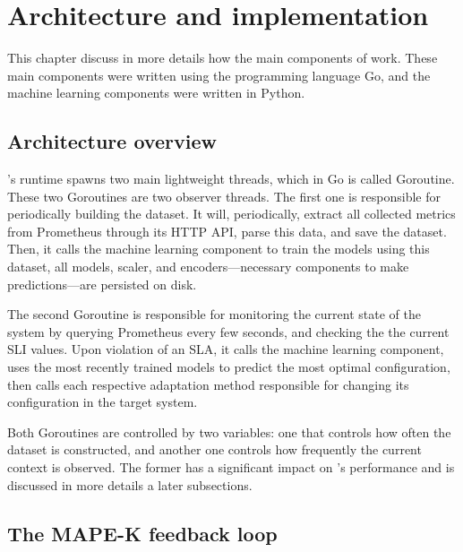 \section{Architecture and implementation}

This chapter discuss in more details how the main components of \projectname{} work. These main components were written using the programming language Go, and the machine learning components were written in Python.

\subsection{Architecture overview}

\projectname{}'s runtime spawns two main lightweight threads, which in Go is called Goroutine. These two Goroutines are two observer threads. The first one is responsible for periodically building the dataset. It will, periodically, extract all collected metrics from Prometheus through its HTTP API, parse this data, and save the dataset. Then, it calls the machine learning component to train the models using this dataset, all models, scaler, and encoders---necessary components to make predictions---are persisted on disk.

The second Goroutine is responsible for monitoring the current state of the system by querying Prometheus every few seconds, and checking the the current SLI values. Upon violation of an SLA, it calls the machine learning component, uses the most recently trained models to predict the most optimal configuration, then calls each respective adaptation method responsible for changing its configuration in the target system.

Both Goroutines are controlled by two variables: one that controls how often the dataset is constructed, and another one controls how frequently the current context is observed. The former has a significant impact on \projectname{}'s performance and is discussed in more details a later subsections.

\subsection{The MAPE-K feedback loop}

